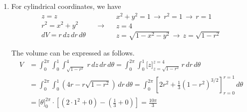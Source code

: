 \documentclass[a4paper, 12pt]{article}
\begin{document}
\begin{enumerate}[leftmargin=*,label=\textbf{\arabic*.}]
\begin{enumerate}[leftmargin=*,label=\textbf{\alph*.}]
In fact, we are looking for the minimum value of the upper bound for $\rho$ between $\displaystyle\frac1{\sin\phi}$ and $\displaystyle\frac4{\cos\phi}$. Hence, we can write the equivalent expression as follows.
\[\boxed{V=\displaystyle\int_0^{2\pi}\int_0^{\pi/2}\int_1^{\min\left(\textstyle\frac4{\cos\phi},\frac1{\sin\phi}\right)}\,\rho^2\sin\phi\,d\rho\,d\phi\,d\theta}\]

\item For cylindrical coordinates, we have
\[
\begin{array}{c}
z=z\\
r^2=x^2+y^2\\
dV=r\,dz\,dr\,d\theta
\end{array}\quad\rightarrow\quad
\begin{array}{c}
x^2+y^2=1\,\rightarrow\,r^2 = 1\,\rightarrow\,r=1\\
z=4\\
z=\sqrt{1-x^2-y^2}\,\rightarrow\,z=\sqrt{1-r^2}
\end{array}
\]

The volume can be expressed as follows.
\begin{align*}
    V&=\int_0^{2\pi}\int_0^1\int_{\sqrt{1-r^2}}^{4}\,r\,dz\,dr\,d\theta=\int_0^{2\pi}\int_0^1\big[z\big]_{z=\sqrt{1-r^2}}^{z=4}\,r\,dr\,d\theta\\[1em]&=\int_0^{2\pi}\int_0^1\left(4r-r\sqrt{1-r^2}\right)\,dr\,d\theta=\int_0^{2\pi}\left[2r^2 + \frac13\left(1-r^2\right)^{3/2}\right]_{r=0}^{r=1}\,d\theta\\[1em]&=\big[\theta\big]_0^{2\pi}\cdot\left[\left(2\cdot1^2 +0\right)-\left(\frac13+0\right)\right]=\boxed{\frac{10\pi}3}
\end{align*}
\end{enumerate}
\end{enumerate}
\end{document}
